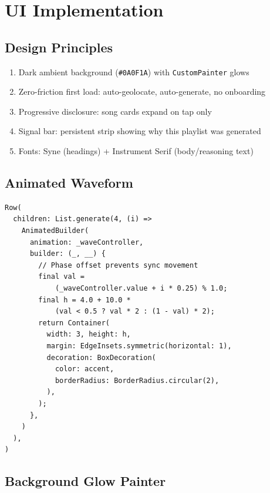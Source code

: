 \documentclass[12pt, a4paper]{report}
\begin{document}
\chapter{UI Implementation}

\section{Design Principles}

\begin{enumerate}[noitemsep]
  \item Dark ambient background (\texttt{\#0A0F1A}) with \texttt{CustomPainter} glows
  \item Zero-friction first load: auto-geolocate, auto-generate, no onboarding
  \item Progressive disclosure: song cards expand on tap only
  \item Signal bar: persistent strip showing why this playlist was generated
  \item Fonts: Syne (headings) + Instrument Serif (body/reasoning text)
\end{enumerate}

\section{Animated Waveform}

\begin{tcolorbox}[cyanbox, title=Phase-offset waveform bars]
\begin{lstlisting}[style=dartcode]
Row(
  children: List.generate(4, (i) =>
    AnimatedBuilder(
      animation: _waveController,
      builder: (_, __) {
        // Phase offset prevents sync movement
        final val =
            (_waveController.value + i * 0.25) % 1.0;
        final h = 4.0 + 10.0 *
            (val < 0.5 ? val * 2 : (1 - val) * 2);
        return Container(
          width: 3, height: h,
          margin: EdgeInsets.symmetric(horizontal: 1),
          decoration: BoxDecoration(
            color: accent,
            borderRadius: BorderRadius.circular(2),
          ),
        );
      },
    )
  ),
)
\end{lstlisting}
\end{tcolorbox}

\section{Background Glow Painter}
\end{document}
